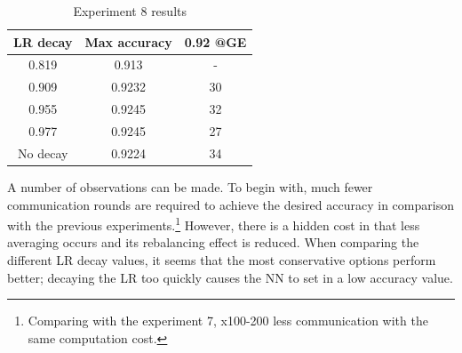 \begin{figure}[H]
    \centering
\end{figure}
\begin{table}
    \center
    \begin{tabular}
        {
            | c | c | c |
        }
        \hline
        LR decay & Max accuracy & 0.92 @GE\\\hline
        0.819 & 0.913 & -\\\hline
        0.909 & 0.9232 & 30\\\hline
        0.955 & 0.9245 & 32\\\hline
        0.977 & 0.9245 & 27\\\hline
        No decay & 0.9224 & 34\\\hline
    \end{tabular}
    \caption{Experiment 8 results}
\end{table}

A number of observations can be made. To begin with, much fewer communication rounds are required to achieve the desired accuracy in comparison with the previous experiments.\footnote{Comparing with the experiment 7, x100-200 less communication with the same computation cost.} However, there is a hidden cost in that less averaging occurs and its rebalancing effect is reduced. When comparing the different LR decay values, it seems that the most conservative options perform better; decaying the LR too quickly causes the NN to set in a low accuracy value.

